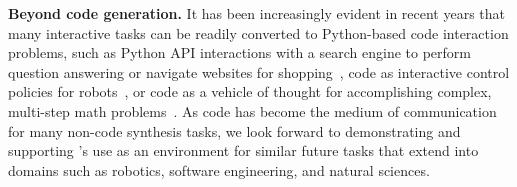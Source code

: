 \textbf{Beyond code generation.} It has been increasingly evident in recent years that many interactive tasks can be readily converted to Python-based code interaction problems, such as Python API interactions with a search engine to perform question answering or navigate websites for shopping~\cite{yao2022webshop}, code as interactive control policies for robots~\cite{liang2023code}, or code as a vehicle of thought for accomplishing complex, multi-step math problems~\cite{chen2023program}.
As code has become the medium of communication for many non-code synthesis tasks, we look forward to demonstrating and supporting \benchmark{}'s use as an environment for similar future tasks that extend into domains such as robotics, software engineering, and natural sciences.